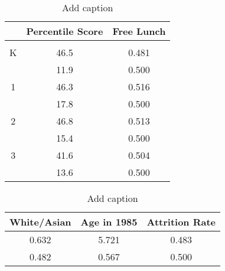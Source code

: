 \documentclass{article}
\begin{document}

\begin{table}[htbp]
  \centering
  \caption{Add caption}
    \begin{tabular}{rcc}
    \toprule
          & Percentile Score & Free Lunch \\
    \midrule
          &       &  \\
    \multicolumn{1}{c}{K} & 46.5  & 0.481  \\
          & 11.9  & 0.500  \\
    \multicolumn{1}{c}{1} & 46.3  & 0.516  \\
          & 17.8  & 0.500  \\
    \multicolumn{1}{c}{2} & 46.8  & 0.513  \\
          & 15.4  & 0.500  \\
    \multicolumn{1}{c}{3} & 41.6  & 0.504  \\
          & 13.6  & 0.500  \\
    \bottomrule
    \bottomrule
    \end{tabular}%
  \label{tab:addlabel}%
\end{table}%



\begin{table}[htbp]
  \centering
  \caption{Add caption}
    \begin{tabular}{ccc}
    \toprule
    \multicolumn{1}{l}{White/Asian} & \multicolumn{1}{l}{Age in 1985} & \multicolumn{1}{l}{Attrition Rate} \\
    \midrule
    0.632  & 5.721  & 0.483  \\
    0.482  & 0.567  & 0.500  \\
    \bottomrule
    \bottomrule
    \end{tabular}%
  \label{tab:addlabel}%
\end{table}%


\end{document}
